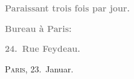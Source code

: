\pstart
           \begin{otherlanguage}{french}\textcolor{gray}{\textbf{\textbf{Paraissant trois fois par jour.}}}\end{otherlanguage}\pend
           
\pstart
           \begin{otherlanguage}{french}\textcolor{gray}{\textbf{\textbf{Bureau à Paris:}}}\end{otherlanguage}\pend
           
\pstart
           \begin{otherlanguage}{french}\textcolor{gray}{\textbf{\textbf{24. Rue Feydeau.}}}\end{otherlanguage}\hfill \textsc{Paris}, 23. Januar.\pend
           
